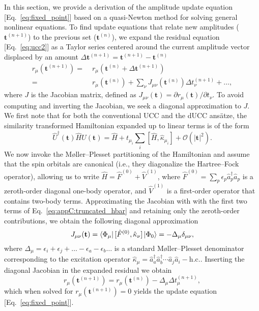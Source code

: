 \documentclass[aps,prx, reprint]{revtex4-2}
\newcommand{\cop}[1]{\hat{a}^{\dagger}_{#1}}
\newcommand{\aop}[1]{\hat{a}_{#1}}
\newcommand*{\qucc}{dUCC\xspace}
\begin{document}
In this section, we provide a derivation of the amplitude update equation [Eq.~\eqref{eq:fixed_point}] based on a quasi-Newton method for solving general nonlinear equations.
To find update equations that relate new amplitudes ($\mathbf{t}^{(n+1)}$) to the previous set ($\mathbf{t}^{(n)}$), we expand the residual equation [Eq.~\eqref{eq:ucc2}] as a Taylor series centered around the current amplitude vector displaced by an amount $\Delta \mathbf{t}^{(n+1)} = \mathbf{t}^{(n+1)} - \mathbf{t}^{(n)}$
\begin{equation}
\begin{split}
r_\mu(\mathbf{t}^{(n+1)})   = \; & r_\mu(\mathbf{t}^{(n)} + \Delta \mathbf{t}^{(n+1)})  \\
 = \; & r_\mu(\mathbf{t}^{(n)}) + \sum_\nu J_{\mu\nu}(\mathbf{t}^{(n)})  \Delta t_\nu^{(n+1)} + \ldots,
\end{split}
\end{equation}
where $J$ is the Jacobian matrix, defined as $J_{\mu\nu}(\mathbf{t}) = \partial r_\mu(\mathbf{t}) / \partial t_\nu$.
To avoid computing and inverting the Jacobian, we seek a diagonal approximation to $J$.
We first note that for both the conventional UCC and the \qucc ans\"{a}tze, the similarity transformed Hamiltonian expanded up to linear terms is of the form
\begin{equation}
\hat{U}^\dagger(\mathbf{t}) \hat{H} \hat{U}(\mathbf{t})
= \hat{H} + t_{\mu_i}  \sum_i [\hat{H}, \hat{\kappa}_{\mu_i}]
+ \mathcal{O}(|\textbf{t}|^2).
\label{eq:appC:truncated_hbar}
\end{equation}
We now invoke the M{\o}ller--Plesset partitioning of the Hamiltonian and assume that the spin orbitals are canonical (i.e., they diagonalize the Hartree--Fock operator), allowing us to write $\hat{H} = \hat{F}^{(0)} + \hat{V}^{(1)}$, where $\hat{F}^{(0)} = \sum_{p} \epsilon_p \cop{p} \aop{p} $ is a zeroth-order diagonal one-body operator, and $\hat{V}^{(1)}$ is a first-order operator that contains two-body terms.
Approximating the Jacobian with with the first two terms of Eq.~\eqref{eq:appC:truncated_hbar} and retaining only the zeroth-order contributions, we obtain the following diagonal approximation
\begin{equation}
J_{\mu\nu}(\mathbf{t}) = \bra{\Phi_\mu} [\hat{F}^{(0)} , \hat{\kappa}_{\nu}]\ket{\Phi_0} = - \Delta_\mu \delta_{\mu \nu},
\end{equation}
where $\Delta_\mu = \epsilon_i + \epsilon_j + \ldots -\epsilon_a -\epsilon_b \ldots$ is a standard M{\o}ller--Plesset denominator corresponding to the excitation operator $\hat{\kappa}_\mu = \cop{a} \cop{b} \cdots \aop{j}\aop{i} - \mathrm{h.c.}$.
Inserting the diagonal Jacobian in the expanded residual we obtain
\begin{equation}
r_\mu(\mathbf{t}^{(n+1)})
= r_\mu(\mathbf{t}^{(n)}) - \Delta_\mu  \Delta t_\mu^{(n+1)},
\end{equation}
which when solved for $r_\mu(\mathbf{t}^{(n+1)}) = 0$ yields the update equation [Eq.~\eqref{eq:fixed_point}].
\end{document}
